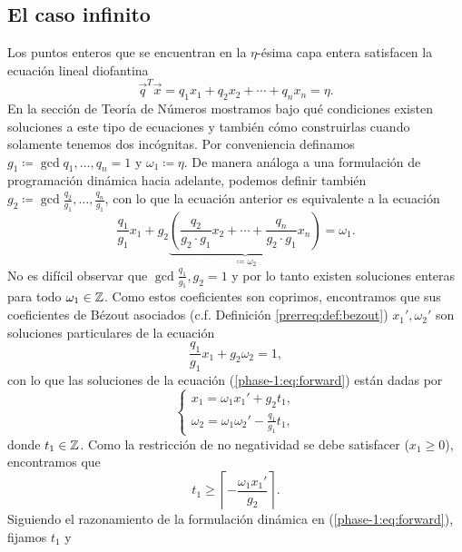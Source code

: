 \subsection{El caso infinito}
\noindent
Los puntos enteros que se encuentran en la $\eta$-ésima capa entera satisfacen la ecuación lineal
diofantina
\begin{equation}
	\label{phase-1:eq:dioph}
	\vec{q}^T\vec{x} = q_1x_1 + q_2x_2 + \cdots + q_nx_n = \eta.
\end{equation}
En la sección de Teoría de Números mostramos bajo qué condiciones existen soluciones a este tipo de
ecuaciones y también cómo construirlas cuando solamente tenemos dos incógnitas. Por conveniencia
definamos $g_1 \coloneq \gcd{q_1, \ldots, q_n} = 1$ y $\omega_1 \coloneq \eta$. De manera análoga a
una formulación de programación dinámica hacia adelante, podemos definir también
$g_2 \coloneq \gcd{\frac{q_2}{g_1}, \ldots, \frac{q_n}{g_1}}$, con lo que la ecuación anterior es
equivalente a la ecuación
\begin{equation}
	\label{phase-1:eq:forward}
	\frac{q_1}{g_1}x_1 + g_2
		\underbrace{
		\left(\frac{q_2}{g_2 \cdot g_1}x_2 + \cdots + \frac{q_n}{g_2 \cdot g_1}x_n\right)}_{\coloneq
		\omega_2}
	= \omega_1.
\end{equation}
No es difícil observar que $\gcd{\frac{q_1}{g_1}, g_2} = 1$ y por lo tanto existen soluciones
enteras para todo $\omega_1 \in \mathbb{Z}$. Como estos coeficientes son coprimos, encontramos que sus
coeficientes de Bézout asociados (c.f. Definición \ref{prerreq:def:bezout}) $x_1', \omega_2'$ son
soluciones particulares de la ecuación
\begin{equation*}
	\frac{q_1}{g_1}x_1 + g_2\omega_2 = 1,
\end{equation*}
con lo que las soluciones de la ecuación (\ref{phase-1:eq:forward}) están dadas por
\begin{equation*}
	\begin{cases}
		x_1 = \omega_1x_1' + g_2t_1, \\
		\omega_2 = \omega_1\omega_2' - \frac{q_1}{g_1}t_1,
	\end{cases}
\end{equation*}
donde $t_1 \in \mathbb{Z}$. Como la restricción de no negatividad se debe satisfacer ($x_1 \geq 0$),
encontramos que
\begin{equation*}
	t_1 \geq \left\lceil -\frac{\omega_1x_1'}{g_2} \right\rceil.
\end{equation*}
Siguiendo el razonamiento de la formulación dinámica en (\ref{phase-1:eq:forward}), fijamos $t_1$ y
